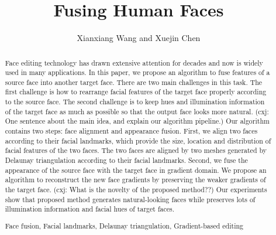 \documentclass[runningheads,a4paper]{llncs}
\newcommand{\keywords}[1]{\par\addvspace\baselineskip
\noindent\keywordname\enspace\ignorespaces#1}
\newcommand{\cxj}[1]{\textcolor[rgb]{1.00,0.00,0.00}{(cxj: #1)}}
\newcommand{\mdf}[1]{\textcolor[rgb]{0.00,0.00,1.00}{#1}}
\begin{document}
\mainmatter
\title{Fusing Human Faces}
\author{Xianxiang Wang and Xuejin Chen}
\maketitle


\begin{abstract}

\mdf{Face editing technology has drawn extensive attention for decades and now is widely used in many applications.} 
%
In this paper, we propose an algorithm to fuse features of a source face into another target face. 
There are two main challenges in this task. 
The first challenge is how to rearrange facial features of the target face properly according to the source face. 
The second challenge is to keep hues and illumination information of the target face as much as possible so that the output face looks more natural. 
%
\cxj{One sentence about the main idea, and explain our algorithm pipeline.}
%
Our algorithm contains two steps: \mdf{face alignment and appearance fusion}. 
First, we align two faces according to their facial landmarks, which provide the size, location and distribution of facial features of the two faces.
The two faces are aligned by two meshes generated by Delaunay triangulation according to their facial landmarks.
Second, we fuse the appearance of the source face with the target face in gradient domain. 
We propose an algorithm to reconstruct the new face gradients by preserving the weaker gradients of the target face. 
\cxj{What is the novelty of the proposed method??}
%
Our experiments show that proposed method generates natural-looking faces while preserves lots of illumination information and facial hues of target faces.
%

\keywords{Face fusion, Facial landmarks, Delaunay triangulation, Gradient-based editing}
\end{abstract}








\end{document}

